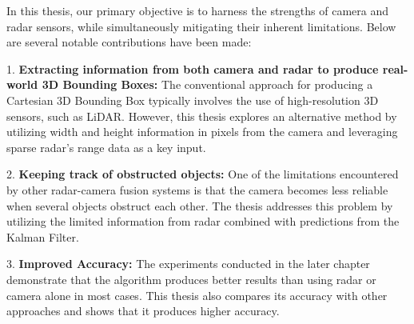 In this thesis, our primary objective is to harness the strengths of camera and radar sensors, 
while simultaneously mitigating their inherent limitations. 
Below are several notable contributions have been made:

1. \textbf{Extracting information from both camera and radar to produce real-world 3D Bounding Boxes: }
The conventional approach for producing a Cartesian 3D Bounding Box typically involves the use of high-resolution 3D sensors, 
such as LiDAR. 
However, this thesis explores an alternative method 
by utilizing width and height information in pixels from the camera and
leveraging sparse radar's range data as a key input.

2. \textbf{Keeping track of obstructed objects: }
One of the limitations encountered by other radar-camera fusion systems is 
that the camera becomes less reliable when several objects obstruct each other.
The thesis addresses this problem by utilizing the limited information from radar
combined with predictions from the Kalman Filter.

3. \textbf{Improved Accuracy: }
The experiments conducted in the later chapter demonstrate that the algorithm
produces better results than using radar or camera alone in most cases.
This thesis also compares its accuracy with other approaches
and shows that it produces higher accuracy.

